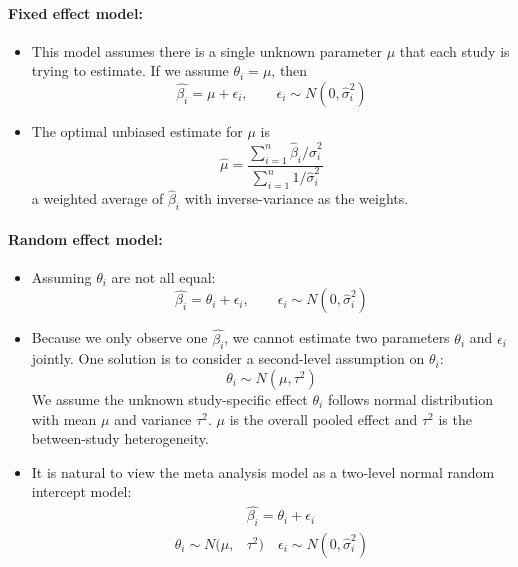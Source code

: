 \documentclass{article}
\begin{document}
\paragraph{Fixed effect model:}
\begin{itemize}
    \item This model assumes there is a single unknown parameter $\mu$ that each study is trying to estimate. If we assume $\theta_i=\mu$, then
        \begin{equation}
            \hat{\beta_i}=\mu+\epsilon_i, \qquad \epsilon_i\sim N(0, \hat{\sigma}^2_i)
        \end{equation}
    \item The optimal unbiased estimate for $\mu$ is
        \begin{equation}
            \hat{\mu}=\frac{\sum_{i=1}^n\hat{\beta}_i/\hat{\sigma}^2_i}{\sum_{i=1}^n1/\hat{\sigma}^2_i}
        \end{equation}
        a weighted average of $\hat{\beta}_i$ with inverse-variance as the weights.
\end{itemize}

\paragraph{Random effect model:}
\begin{itemize}
    \item Assuming $\theta_i$ are not all equal:
        \begin{equation}
            \hat{\beta_i}=\theta_i+\epsilon_i, \qquad \epsilon_i\sim N(0, \hat{\sigma}^2_i)
        \end{equation}
    \item Because we only observe one $\hat{\beta_i}$, we cannot estimate two parameters $\theta_i$ and $\epsilon_i$ jointly. One solution is to consider a second-level assumption on $\theta_i$:
        \begin{equation}
            \theta_i\sim N(\mu, \tau^2)
        \end{equation}
        We assume the unknown study-specific effect $\theta_i$ follows normal distribution with mean $\mu$ and variance $\tau^2$. $\mu$ is the overall pooled effect and $\tau^2$ is the between-study heterogeneity.
    \item It is natural to view the meta analysis model as a two-level normal random intercept model:
        \begin{align}
            &\hat{\beta_i}=\theta_i+\epsilon_i \\
            \theta_i\sim N(\mu, &\tau^2) \quad \epsilon_i\sim N(0, \hat{\sigma}^2_i)
        \end{align}
\end{itemize}
\end{document}
